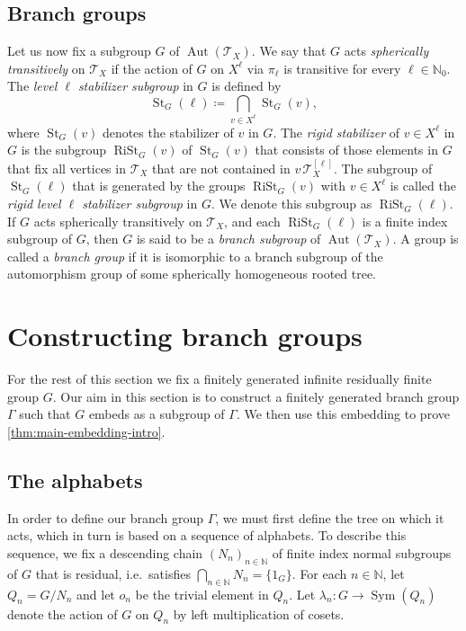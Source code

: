 \documentclass[a4paper]{amsart}
\numberwithin{equation}{section}
\theoremstyle{definition}
\theoremstyle{remark}
\newcommand{\N}{\mathbb{N}}
\DeclareMathOperator{\Aut}{Aut}
\DeclareMathOperator{\RiSt}{RiSt}
\DeclareMathOperator{\St}{St}
\DeclareMathOperator{\Sym}{Sym}
\newcommand{\T}{\mathcal{T}}
\newcommand{\defeq}\coloneqq%
\begin{document}
\subsection{Branch groups}\label{subsec:branch-groups} Let us now fix a subgroup $G$ of $\Aut(\T_X)$.
We say that $G$ acts \emph{spherically transitively} on $\T_X$ if the action of $G$ on $X^{\ell}$ via $\pi_{\ell}$ is transitive for every $\ell \in \N_0$.
The \emph{level $\ell$ stabilizer subgroup} in $G$ is defined by
\[
\St_G(\ell) \defeq \bigcap \limits_{v \in X^{\ell}} \St_G(v),
\]
where $\St_G(v)$ denotes the stabilizer of $v$ in $G$.
The \emph{rigid stabilizer} of $v \in X^{\ell}$ in $G$ is the subgroup $\RiSt_G(v)$ of $\St_G(v)$ that consists of those elements in $G$ that fix all vertices in $\T_X$ that are not contained in $v\,\T_{X}^{[\ell]}$.
The subgroup of $\St_G(\ell)$ that is generated by the groups $\RiSt_G(v)$ with $v \in X^{\ell}$ is called the \emph{rigid level $\ell$ stabilizer subgroup} in $G$. We denote this subgroup as $\RiSt_G(\ell)$.
If $G$ acts spherically transitively on $\T_X$, and each $\RiSt_G(\ell)$ is a finite index subgroup of $G$, then $G$ is said to be a \emph{branch subgroup} of $\Aut(\T_X)$.
A group is called a \emph{branch group} if it is isomorphic to a branch subgroup of the automorphism group of some spherically homogeneous rooted tree.

\section{Constructing branch groups}\label{sec:constructing-branch-groups}

For the rest of this section we fix a finitely generated infinite residually finite group $G$.
Our aim in this section is to construct a finitely generated branch group $\Gamma$ such that $G$ embeds as a subgroup of $\Gamma$.
We then use this embedding to prove \cref{thm:main-embedding-intro}.

\subsection{The alphabets}\label{subsec:alphabets}

In order to define our branch group $\Gamma$, we must first define the tree on which it acts, which in turn is based on a sequence of alphabets.
To describe this sequence, we fix a descending chain $(N_n)_{n\in \N}$ of finite index normal subgroups of $G$ that is residual, i.e.\ satisfies $\bigcap_{n\in \N} N_n = \{1_G\}$.
For each $n \in \N$, let $Q_n=G/N_n$ and let $o_n$ be the trivial element in $Q_n$.
Let $\lambda_n \colon G \rightarrow \Sym(Q_n)$ denote the action of $G$ on $Q_n$ by left multiplication of cosets.
\end{document}

